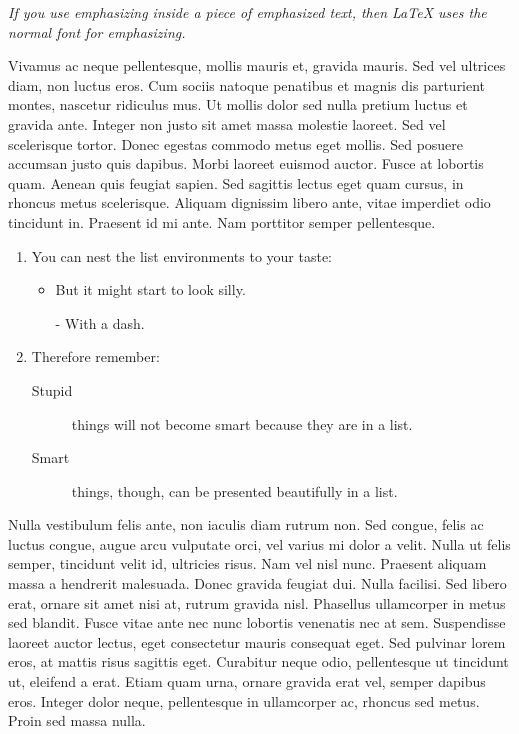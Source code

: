 \emph{If you use
  emphasizing inside a piece
  of emphasized text, then
  \LaTeX{} uses the
  \emph{normal} font for
  emphasizing.}\newline

Vivamus ac neque pellentesque, mollis mauris et, gravida mauris. Sed vel ultrices diam, non luctus eros. Cum sociis natoque penatibus et magnis dis parturient montes, nascetur ridiculus mus. Ut mollis dolor sed nulla pretium luctus et gravida ante. Integer non justo sit amet massa molestie laoreet. Sed vel scelerisque tortor. Donec egestas commodo metus eget mollis. Sed posuere accumsan justo quis dapibus. Morbi laoreet euismod auctor. Fusce at lobortis quam. Aenean quis feugiat sapien. Sed sagittis lectus eget quam cursus, in rhoncus metus scelerisque. Aliquam dignissim libero ante, vitae imperdiet odio tincidunt in. Praesent id mi ante. Nam porttitor semper pellentesque.

\begin{flushleft}
  \begin{enumerate}
  \item You can nest the list
    environments to your taste:
    \begin{itemize}
    \item But it might start to
      look silly.
    \item[-] With a dash.
    \end{itemize}
  \item Therefore remember:
    \begin{description}
    \item[Stupid] things will not
      become smart because they are
      in a list.
    \item[Smart] things, though,
      can be presented beautifully
      in a list.
    \end{description}
  \end{enumerate}
\end{flushleft}

Nulla vestibulum felis ante, non iaculis diam rutrum non. Sed congue, felis ac luctus congue, augue arcu vulputate orci, vel varius mi dolor a velit. Nulla ut felis semper, tincidunt velit id, ultricies risus. Nam vel nisl nunc. Praesent aliquam massa a hendrerit malesuada. Donec gravida feugiat dui. Nulla facilisi. Sed libero erat, ornare sit amet nisi at, rutrum gravida nisl. Phasellus ullamcorper in metus sed blandit. Fusce vitae ante nec nunc lobortis venenatis nec at sem. Suspendisse laoreet auctor lectus, eget consectetur mauris consequat eget. Sed pulvinar lorem eros, at mattis risus sagittis eget. Curabitur neque odio, pellentesque ut tincidunt ut, eleifend a erat. Etiam quam urna, ornare gravida erat vel, semper dapibus eros. Integer dolor neque, pellentesque in ullamcorper ac, rhoncus sed metus. Proin sed massa nulla.

